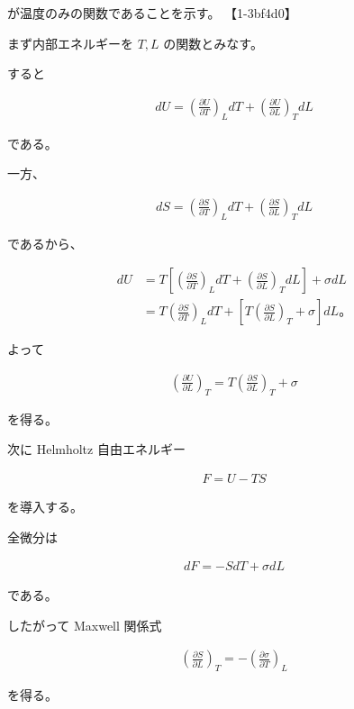 \documentclass[platex,dvipdfmx,a4paper]{jsarticle}
\begin{document}
が温度のみの関数であることを示す。 【1-3bf4d0】

まず内部エネルギーを $T,L$ の関数とみなす。

すると

\begin{align*}
dU
=
\left(
\frac{\partial U}{\partial T}
\right)_L dT
+
\left(
\frac{\partial U}{\partial L}
\right)_T dL
\end{align*}

である。

一方、

\begin{align*}
dS
=
\left(
\frac{\partial S}{\partial T}
\right)_L dT
+
\left(
\frac{\partial S}{\partial L}
\right)_T dL
\end{align*}

であるから、

\begin{align*}
dU
&=
T
\left[
\left(
\frac{\partial S}{\partial T}
\right)_L dT
+
\left(
\frac{\partial S}{\partial L}
\right)_T dL
\right]
+\sigma dL \\
&=
T
\left(
\frac{\partial S}{\partial T}
\right)_L dT
+
\left[
T
\left(
\frac{\partial S}{\partial L}
\right)_T
+\sigma
\right]dL。
\end{align*}

よって

\begin{align*}
\left(
\frac{\partial U}{\partial L}
\right)_T
=
T
\left(
\frac{\partial S}{\partial L}
\right)_T
+\sigma
\end{align*}

を得る。

次に Helmholtz 自由エネルギー

\begin{align*}
F=U-TS
\end{align*}

を導入する。

全微分は

\begin{align*}
dF
=
-SdT+\sigma dL
\end{align*}

である。

したがって Maxwell 関係式

\begin{align*}
\left(
\frac{\partial S}{\partial L}
\right)_T
=
-\left(
\frac{\partial \sigma}{\partial T}
\right)_L
\end{align*}

を得る。
\end{document}

